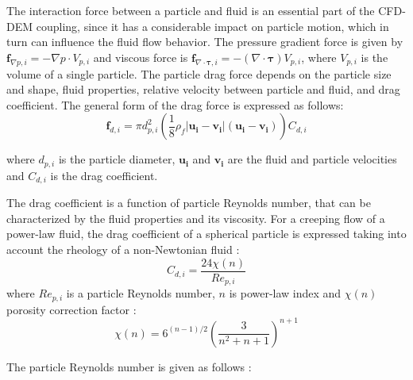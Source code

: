 \documentclass{article}
\begin{document}


The interaction force between a particle and fluid is an essential part of the CFD-DEM coupling, since it has a considerable impact on particle motion, which in turn can influence the fluid flow behavior. The pressure gradient force is given by $ \bm f_{\nabla p,i} = - \nabla p \cdot V_{p,i} $ and viscous force is  $ \bm f_{\nabla \cdot \bm{\tau},i} = - (\nabla \cdot \bm{\tau}) V_{p,i} $, where $V_{p,i} $ is the volume of a single particle. The particle drag force depends on the particle size and shape, fluid properties, relative velocity between particle and fluid,  and drag coefficient. The general form of the drag force is expressed as follows:
\begin{equation}
\bm{f}_{d,i} = \pi d^2_{p,i}\left (\displaystyle\frac{1}{8}  \rho_f |\bm{u_i}-\bm{v_i}| (\bm{u_i} -\bm{v_i}) \right)C_{d,i} \label{eq:8}
\end{equation}

where $d_{p, i}$ is the particle diameter, $\bm{u_i}$ and $\bm{v_i}$ are the fluid and particle velocities and $C_{d, i}$ is the drag coefficient.

The drag coefficient is a function of particle Reynolds number, that can be characterized by the fluid properties and its viscosity. For a creeping flow of a power-law fluid, the drag coefficient of a spherical particle is expressed taking into account the rheology of a non-Newtonian fluid \citep{dazhi1985drag}: 
\begin{equation}
C_{d, i} = \frac{24 \chi(n)}{{Re_{p, i}}} \label{eq:9}
\end{equation}
where $Re_{p, i}$ is a particle Reynolds number, $n$ is power-law index and $\chi (n)$ porosity correction factor \citep{renaud2004power}:
\begin{equation}
\chi (n) = 6^{(n-1)/2} \left(\displaystyle \frac{3}{n^2 + n + 1} \right)^{n+1} \label{eq:10}
\end{equation}

The particle Reynolds number is given as follows \citep{atapattu1995creeping}:
\end{document}
